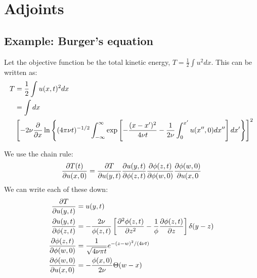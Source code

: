 \chapter{Adjoints}

\section{Example: Burger's equation}

Let the objective function be the total kinetic energy, $T = \frac{1}{2} \int u^2 dx$.
This can be written as:
\begin{align} \elabel{burg_T}
T &= \frac{1}{2} \int u(x,t)^2 dx \\
&= \int dx \\
&\left[-2 \nu \pder{}{x} \ln \left\{(4 \pi \nu t)^{-1/2} \int_{-\infty}^\infty \exp\left[-\frac{(x-x')^2}{4\nu t} - \frac{1}{2\nu} \int_0^{x'} u(x'',0) dx''\right] dx'\right\} \right]^2 \\
\end{align}

We use the chain rule:
\begin{equation}
\frac{\partial T(t)}{\partial u(x,0)} = \frac{\partial T}{\partial u(y,t)} \frac{\partial u(y,t)}{\partial \phi(z,t)} \frac{\partial \phi(z,t)}{\partial \phi(w,0)} \frac{\partial \phi(w,0)}{\partial u(x,0} 
\end{equation}
We can write each of these down:
\begin{align*}
\frac{\partial T}{\partial u(y,t)} &= u(y,t) \\
\frac{\partial u(y,t)}{\partial \phi(z,t)} &= -\frac{2 \nu}{\phi(z,t)} \left[\frac{\partial^2 \phi(z,t)}{\partial z^2} - \frac{1}{\phi} \frac{\partial \phi(z,t)}{\partial z}\right] \delta(y-z) \\
\frac{\partial \phi(z,t)}{\partial \phi(w,0)} &= \frac{1}{\sqrt{4 \nu \pi t}} e^{-(z-w)^2/(4 \nu t)} \\
\frac{\partial \phi(w,0)}{\partial u(x,0)} &= - \frac{\phi(x,0)}{2 \nu} \Theta(w-x) 
\end{align*}
